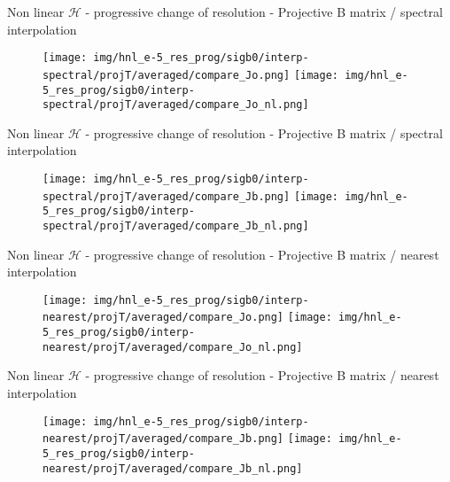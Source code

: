 \documentclass[francais]{beamer}
\begin{document}
\begin{frame}{Non linear $\mathcal{H}$ - progressive change of resolution - Projective B matrix / spectral interpolation}
\begin{center}
\begin{figure}
  \texttt{[image: img/hnl\_e-5\_res\_prog/sigb0/interp-spectral/projT/averaged/compare\_Jo.png]}
\endminipage\hfill
{}
  \texttt{[image: img/hnl\_e-5\_res\_prog/sigb0/interp-spectral/projT/averaged/compare\_Jo\_nl.png]}
\endminipage
\end{figure}
\end{center}
\end{frame}

\begin{frame}{Non linear $\mathcal{H}$ - progressive change of resolution - Projective B matrix / spectral interpolation}
\begin{center}
\begin{figure}
  \texttt{[image: img/hnl\_e-5\_res\_prog/sigb0/interp-spectral/projT/averaged/compare\_Jb.png]}
\endminipage\hfill
{}
  \texttt{[image: img/hnl\_e-5\_res\_prog/sigb0/interp-spectral/projT/averaged/compare\_Jb\_nl.png]}
\endminipage
\end{figure}
\end{center}
\end{frame}
\begin{frame}{Non linear $\mathcal{H}$ - progressive change of resolution - Projective B matrix / nearest interpolation}
\begin{center}
\begin{figure}
  \texttt{[image: img/hnl\_e-5\_res\_prog/sigb0/interp-nearest/projT/averaged/compare\_Jo.png]}
\endminipage\hfill
{}
  \texttt{[image: img/hnl\_e-5\_res\_prog/sigb0/interp-nearest/projT/averaged/compare\_Jo\_nl.png]}
\endminipage
\end{figure}
\end{center}
\end{frame}

\begin{frame}{Non linear $\mathcal{H}$ - progressive change of resolution - Projective B matrix / nearest interpolation}
\begin{center}
\begin{figure}
  \texttt{[image: img/hnl\_e-5\_res\_prog/sigb0/interp-nearest/projT/averaged/compare\_Jb.png]}
\endminipage\hfill
{}
  \texttt{[image: img/hnl\_e-5\_res\_prog/sigb0/interp-nearest/projT/averaged/compare\_Jb\_nl.png]}
\endminipage
\end{figure}
\end{center}
\end{frame}
\end{document}
